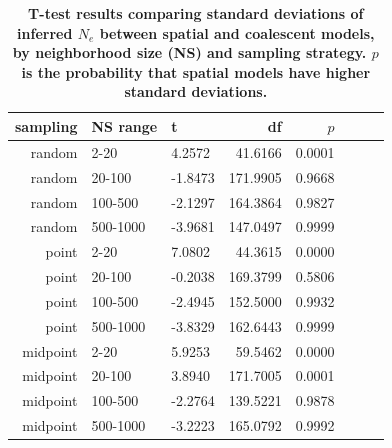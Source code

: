 \documentclass[10pt,twoside,lineno]{gsajnl}
\begin{document}
\begin{table}[ht]
\centering
\caption{\bf T-test results comparing standard deviations of inferred $N_{e}$ between spatial and coalescent models, by neighborhood size (NS) and sampling strategy. $p$ is the probability that spatial models have higher standard deviations.}
\begin{tabular}{rllrrrrr}
  \hline
sampling & NS range & t & df & $p$ \\ 
  \hline
random & 2-20 & 4.2572 & 41.6166 & 0.0001 \\ 
random & 20-100 & -1.8473 & 171.9905 & 0.9668 \\ 
random & 100-500 & -2.1297 & 164.3864  & 0.9827 \\ 
random & 500-1000 & -3.9681 & 147.0497 & 0.9999 \\ 
point & 2-20 & 7.0802 & 44.3615  & 0.0000 \\ 
point & 20-100 & -0.2038 & 169.3799 & 0.5806 \\ 
point & 100-500 & -2.4945 & 152.5000 & 0.9932 \\ 
point & 500-1000 & -3.8329 & 162.6443& 0.9999 \\ 
midpoint & 2-20 & 5.9253 & 59.5462 & 0.0000 \\ 
midpoint & 20-100 & 3.8940 & 171.7005  & 0.0001 \\ 
midpoint & 100-500 & -2.2764 & 139.5221 & 0.9878 \\ 
midpoint & 500-1000 & -3.2223 & 165.0792 & 0.9992 \\ 
   \hline
\end{tabular}
\label{table:demography}
\end{table}


\stopsupplement
\end{document}

